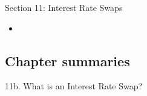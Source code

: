 \begin{ASM_chapter}
Section 11: Interest Rate Swaps
\begin{itemize}[leftmargin = *]
	\item	{}
\end{itemize}
\end{ASM_chapter}

\subsection{Chapter summaries}

\begin{CHPT_SUMM_AUTO}[label = {L.-11b}]{11b. What is an Interest Rate Swap?}

\end{CHPT_SUMM_AUTO}